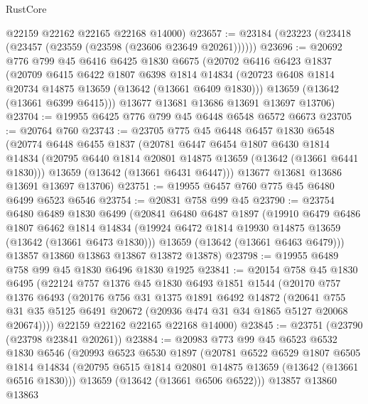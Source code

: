 \begin{lexlean}{RustCore}
\begin{coremodule}
      @22159
      @22162
      @22165
      @22168
      @14000)
@23657 := @23184 (@23223 (@23418 (@23457 (@23559 (@23598 (@23606 @23649 @20261))))))
@23696 := @20692
    @776
    @799
    @45
    @6416
    @6425
    @1830
    @6675
    (@20702
      @6416
      @6423
      @1837
      (@20709
        @6415
        @6422
        @1807
        @6398
        @1814
        @14834
        (@20723 @6408 @1814 @20734 @14875 @13659 (@13642 (@13661 @6409 @1830)))
        @13659
        (@13642 (@13661 @6399 @6415)))
      @13677
      @13681
      @13686
      @13691
      @13697
      @13706)
@23704 := @19955 @6425 @776 @799 @45 @6448 @6548 @6572 @6673
@23705 := @20764 @760
@23743 := @23705
    @775
    @45
    @6448
    @6457
    @1830
    @6548
    (@20774
      @6448
      @6455
      @1837
      (@20781
        @6447
        @6454
        @1807
        @6430
        @1814
        @14834
        (@20795 @6440 @1814 @20801 @14875 @13659 (@13642 (@13661 @6441 @1830)))
        @13659
        (@13642 (@13661 @6431 @6447)))
      @13677
      @13681
      @13686
      @13691
      @13697
      @13706)
@23751 := @19955 @6457 @760 @775 @45 @6480 @6499 @6523 @6546
@23754 := @20831 @758 @99 @45
@23790 := @23754
    @6480
    @6489
    @1830
    @6499
    (@20841
      @6480
      @6487
      @1897
      (@19910
        @6479
        @6486
        @1807
        @6462
        @1814
        @14834
        (@19924 @6472 @1814 @19930 @14875 @13659 (@13642 (@13661 @6473 @1830)))
        @13659
        (@13642 (@13661 @6463 @6479)))
      @13857
      @13860
      @13863
      @13867
      @13872
      @13878)
@23798 := @19955 @6489 @758 @99 @45 @1830 @6496 @1830 @1925
@23841 := @20154
    @758
    @45
    @1830
    @6495
    (@22124
      @757
      @1376
      @45
      @1830
      @6493
      @1851
      @1544
      (@20170
        @757
        @1376
        @6493
        (@20176
          @756
          @31
          @1375
          @1891
          @6492
          @14872
          (@20641 @755 @31 @35 @5125 @6491 @20672 (@20936 @474 @31 @34 @1865 @5127 @20068 @20674))))
      @22159
      @22162
      @22165
      @22168
      @14000)
@23845 := @23751 (@23790 (@23798 @23841 @20261))
@23884 := @20983
    @773
    @99
    @45
    @6523
    @6532
    @1830
    @6546
    (@20993
      @6523
      @6530
      @1897
      (@20781
        @6522
        @6529
        @1807
        @6505
        @1814
        @14834
        (@20795 @6515 @1814 @20801 @14875 @13659 (@13642 (@13661 @6516 @1830)))
        @13659
        (@13642 (@13661 @6506 @6522)))
      @13857
      @13860
      @13863

\end{coremodule}
\end{lexlean}
